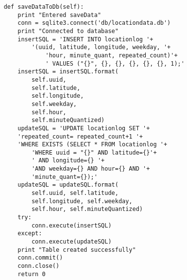 \documentclass[conference]{IEEEtran}
\begin{document}
\begin{lstlisting}
    def saveDataToDb(self):
        print "Entered saveData"
        conn = sqlite3.connect('db/locationdata.db')
        print "Connected to database"
        insertSQL = 'INSERT INTO locationlog '+
            '(uuid, latitude, longitude, weekday, '+
                'hour, minute_quant, repeated_count)'+
                ' VALUES ("{}", {}, {}, {}, {}, {}, 1);'
        insertSQL = insertSQL.format(
            self.uuid, 
            self.latitude, 
            self.longitude, 
            self.weekday, 
            self.hour, 
            self.minuteQuantized)
        updateSQL = 'UPDATE locationlog SET '+
        'repeated_count= repeated_count+1 '+
        'WHERE EXISTS (SELECT * FROM locationlog '+
            'WHERE uuid = "{}" AND latitude={}'+
            ' AND longitude={} '+
            'AND weekday={} AND hour={} AND '+
            'minute_quant={});'
        updateSQL = updateSQL.format(
            self.uuid, self.latitude, 
            self.longitude, self.weekday, 
            self.hour, self.minuteQuantized)
        try:
            conn.execute(insertSQL)
        except:
            conn.execute(updateSQL)
        print "Table created successfully"
        conn.commit()
        conn.close()
        return 0

\end{lstlisting}
\end{document}
